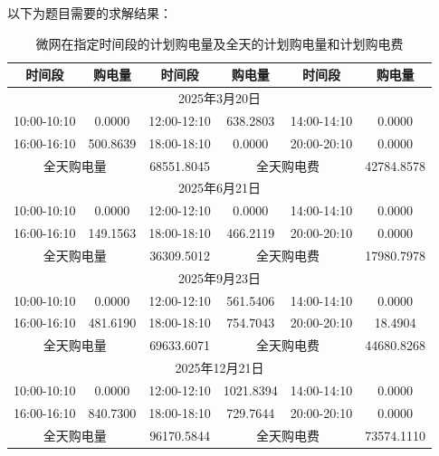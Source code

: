 \documentclass[withoutpreface,bwprint]{cumcmthesis}
\begin{document}
以下为题目需要的求解结果：

\begin{table}[h!]
	\centering
	\footnotesize
	\renewcommand{\arraystretch}{1.2}
	\setlength{\tabcolsep}{15pt}
	\caption{微网在指定时间段的计划购电量及全天的计划购电量和计划购电费}
	\label{tab:q42_spec_1}
	\begin{tabular}{|c|c|c|c|c|c|}
		\hline
		时间段 & 购电量 & 时间段 & 购电量 & 时间段 & 购电量 \\ \hline
		\multicolumn{6}{|c|}{2025年3月20日} \\ \hline
		10:00-10:10 & 0.0000 & 12:00-12:10 & 638.2803 & 14:00-14:10 & 0.0000 \\ \hline
		16:00-16:10 & 500.8639 & 18:00-18:10 & 0.0000 & 20:00-20:10 & 0.0000 \\ \hline
		\multicolumn{2}{|c|}{全天购电量} & 68551.8045 & \multicolumn{2}{c|}{全天购电费} & 42784.8578 \\ \hline
		\multicolumn{6}{|c|}{2025年6月21日} \\ \hline
		10:00-10:10 & 0.0000 & 12:00-12:10 & 0.0000 & 14:00-14:10 & 0.0000 \\ \hline
		16:00-16:10 & 149.1563 & 18:00-18:10 & 466.2119 & 20:00-20:10 & 0.0000 \\ \hline
		\multicolumn{2}{|c|}{全天购电量} & 36309.5012 & \multicolumn{2}{c|}{全天购电费} & 17980.7978 \\ \hline
		\multicolumn{6}{|c|}{2025年9月23日} \\ \hline
		10:00-10:10 & 0.0000 & 12:00-12:10 & 561.5406 & 14:00-14:10 & 0.0000 \\ \hline
		16:00-16:10 & 481.6190 & 18:00-18:10 & 754.7043 & 20:00-20:10 & 18.4904 \\ \hline
		\multicolumn{2}{|c|}{全天购电量} & 69633.6071 & \multicolumn{2}{c|}{全天购电费} & 44680.8268 \\ \hline
		\multicolumn{6}{|c|}{2025年12月21日} \\ \hline
		10:00-10:10 & 0.0000 & 12:00-12:10 & 1021.8394 & 14:00-14:10 & 0.0000 \\ \hline
		16:00-16:10 & 840.7300 & 18:00-18:10 & 729.7644 & 20:00-20:10 & 0.0000 \\ \hline
		\multicolumn{2}{|c|}{全天购电量} & 96170.5844 & \multicolumn{2}{c|}{全天购电费} & 73574.1110 \\ \hline
	\end{tabular}
\end{table}
\end{document}

